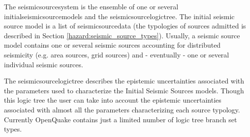 The \gls{seismicsourcesystem} is the ensemble of one or several 
\glspl{initialseismicsourcemodel} and the \gls{seismicsourcelogictree}.
%
The initial seismic source model is a list of \gls{seismicsourcedata}
(the typologies of sources admitted is described in Section
\ref{hazard:seismic_source_types}).
%
Usually, a seismic source model contains one or several seismic 
sources accounting for distributed seismicity (e.g. area sources, 
grid sources) and - eventually - one or several individual seismic 
sources.

The \gls{seismicsourcelogictree} describes the epistemic uncertainties 
associated with the parameters used to characterize the Initial 
Seismic Sources models. 
% 
Though this logic tree the user can take into account the epistemic
uncertainties associated with almost all the parameters characterizing
each source typology. 
% 
Currently OpenQuake contains just a limited number of logic tree
branch set types. 

